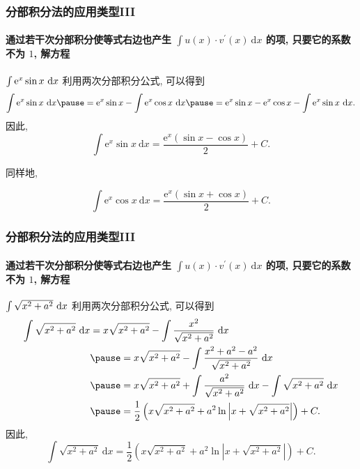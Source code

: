 \documentclass[
10pt,
aspectratio=43,
]{beamer}
\begin{document}
\begin{frame}
	\frametitle{分部积分法的应用类型III}
	\framesubtitle{通过若干次分部积分使等式右边也产生 $\int u(x) \cdot v^{\prime}(x) \mathrm{~d} x$ 的项, 只要它的系数不为 $1$, 解方程}
	\everymath{\displaystyle}
	\begin{exampleblock}{$\color{black}\int \mathrm{e}^x \sin x \mathrm{~d} x$}
		\pause 利用两次分部积分公式, 可以得到 \pause
		$$
			\int \mathrm{e}^x \sin x \mathrm{~d} x\pause =\mathrm{e}^x \sin x-\int \mathrm{e}^x \cos x \mathrm{~d} x\pause =\mathrm{e}^x \sin x-\mathrm{e}^x \cos x-\int \mathrm{e}^x \sin x \mathrm{~d} x.
		$$
		\pause 因此,
		$$
			\int \mathrm{e}^x \sin x \mathrm{~d} x=\frac{\mathrm{e}^x(\sin x-\cos x)}{2}+C.
		$$
	\end{exampleblock}
	\pause 同样地,\pause
	\begin{exampleblock}{}
		$$
			\int \mathrm{e}^x \cos x \mathrm{~d} x=\frac{\mathrm{e}^x(\sin x+\cos x)}{2}+C.
		$$
	\end{exampleblock}
\end{frame}

\begin{frame}
	\frametitle{分部积分法的应用类型III}
	\framesubtitle{通过若干次分部积分使等式右边也产生 $\int u(x) \cdot v^{\prime}(x) \mathrm{~d} x$ 的项, 只要它的系数不为 $1$, 解方程}
	\everymath{\displaystyle}
	{\small
		\begin{exampleblock}{$\color{black}\int \sqrt{x^2+a^2} \mathrm{~d} x$}
			\pause 利用两次分部积分公式, 可以得到
			$$
				\begin{aligned}
					\int \sqrt{x^2+a^2} \mathrm{~d} x & =x \sqrt{x^2+a^2}-\int \frac{x^2}{\sqrt{x^2+a^2}} \mathrm{~d} x                                          \\
					                                  & \pause =x \sqrt{x^2+a^2}-\int \frac{x^2+a^2-a^2}{\sqrt{x^2+a^2}} \mathrm{~d} x                           \\
					                                  & \pause =x \sqrt{x^2+a^2}+\int \frac{a^2}{\sqrt{x^2+a^2}} \mathrm{~d} x-\int \sqrt{x^2+a^2} \mathrm{~d} x \\
					                                  & \pause =\frac{1}{2}\left(x \sqrt{x^2+a^2}+a^2 \ln \left|x+\sqrt{x^2+a^2}\right|\right)+C.
				\end{aligned}
			$$
			\pause 因此,
			$$
				\int \sqrt{x^2+a^2} \mathrm{~d} x=\frac{1}{2}\left(x \sqrt{x^2+a^2}+a^2 \ln \left|x+\sqrt{x^2+a^2}\right|\right)+C.
			$$
		\end{exampleblock}
	}
\end{frame}
\end{document}
